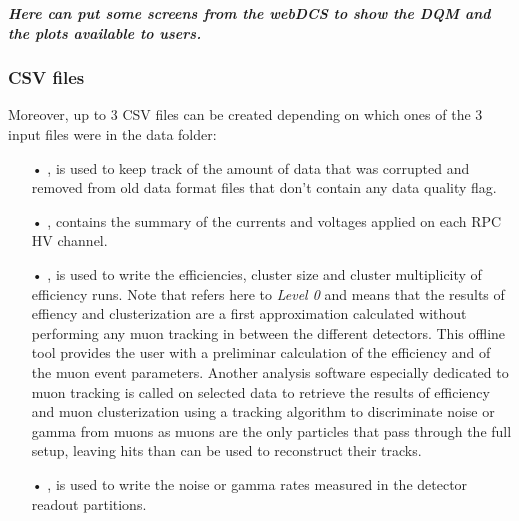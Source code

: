 	\newpage
	
	\vspace{5mm}
	\textbf{\textit{Here can put some screens from the webDCS to show the DQM and the plots available to users.\\}}
	
		\subsubsection{CSV files}
		\label{app2:sssec:CSV}

	Moreover, up to 3 CSV files can be created depending on which ones of the 3 input files were in the data folder:

	\begin{itemize}
		\item[•]  , is used to keep track of the amount of data that was corrupted and removed from old data format files that don't contain any data quality flag.
		\item[•]  , contains the summary of the currents and voltages applied on each RPC HV channel.
		\item[•]  , is used to write the efficiencies, cluster size and cluster multiplicity of efficiency runs. Note that  refers here to \textit{Level 0} and means that the results of effiency and clusterization are a first approximation calculated without performing any muon tracking in between the different detectors. This offline tool provides the user with a preliminar calculation of the efficiency and of the muon event parameters. Another analysis software especially dedicated to muon tracking is called on selected data to retrieve the results of efficiency and muon clusterization using a tracking algorithm to discriminate noise or gamma from muons as muons are the only particles that pass through the full setup, leaving hits than can be used to reconstruct their tracks.
		\item[•]  , is used to write the noise or gamma rates measured in the detector readout partitions.
	\end{itemize}
	
